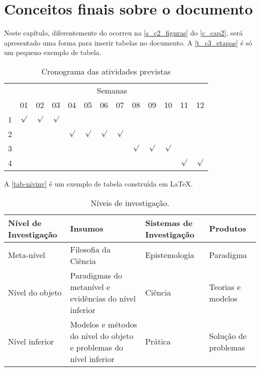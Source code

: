 \chapter{Conceitos finais sobre o documento}
\label{c_cap3}

Neste capítulo, diferentemente do ocorreu na \autoref{s_c2_figuras} do \autoref{c_cap2}, será apresentado uma forma para inserir tabelas no documento. A \autoref{t_c3_etapas} é só um pequeno exemplo de tabela.

\begin{table}[!htpb]
\centering
\caption{Cronograma das atividades previstas}
\label{t_c3_etapas}
 \setlength{\tabcolsep}{3pt}
\begin{tabular}{|c|c|c|c|c|c|c|c|c|c|c|c|c|}\hline
 & \multicolumn{12}{c|}{Semanas}\\ \cline{2-13}
\raisebox{1.5ex}{Etapa} & 01 & 02 & 03 & 04 & 05 & 06 & 07 & 08 & 09 & 10 & 11 & 12 \\ \hline
1 & $\surd$ & $\surd$ & $\surd$ & & & & & & & & & \\ \hline
2 & & & & $\surd$ & $\surd$ & $\surd$ & $\surd$ & & & & & \\ \hline
3 & & & & & & & & $\surd$ & $\surd$ & $\surd$ & & \\ \hline
4 & & & & & & & & & & & $\surd$ & $\surd$ \\ \hline
\end{tabular} 
\end{table} 

A \autoref{tab-nivinv} é um exemplo de tabela construída em \LaTeX.

\begin{table}[htb]
\ABNTEXfontereduzida
\caption[Níveis de investigação]{Níveis de investigação.}
\label{tab-nivinv}
\begin{tabular}{p{3.3cm} p{4.7cm} p{3.7cm} p{2.5cm}}\toprule
   \textbf{Nível de Investigação} & \textbf{Insumos}  & \textbf{Sistemas de Investigação}  & \textbf{Produtos}  \\\midrule
    Meta-nível & Filosofia\index{filosofia} da Ciência  & Epistemologia &
    Paradigma  \\
    Nível do objeto & Paradigmas do metanível e evidências do nível inferior &
    Ciência  & Teorias e modelos \\
    Nível inferior & Modelos e métodos do nível do objeto e problemas do nível inferior & Prática & Solução de problemas  \\
   \bottomrule
\end{tabular}
\end{table}

